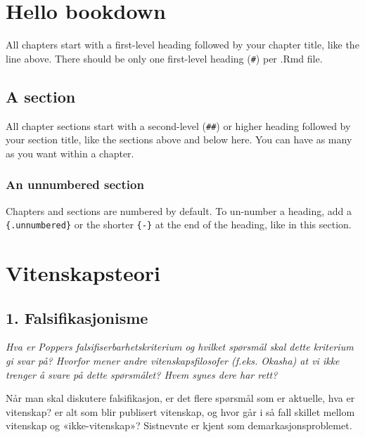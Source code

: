 \documentclass[
]{book}
\begin{document}
\hypertarget{hello-bookdown}{%
\chapter{Hello bookdown}\label{hello-bookdown}}

All chapters start with a first-level heading followed by your chapter title, like the line above. There should be only one first-level heading (\texttt{\#}) per .Rmd file.

\hypertarget{a-section}{%
\section{A section}\label{a-section}}

All chapter sections start with a second-level (\texttt{\#\#}) or higher heading followed by your section title, like the sections above and below here. You can have as many as you want within a chapter.

\hypertarget{an-unnumbered-section}{%
\subsection*{An unnumbered section}\label{an-unnumbered-section}}

Chapters and sections are numbered by default. To un-number a heading, add a \texttt{\{.unnumbered\}} or the shorter \texttt{\{-\}} at the end of the heading, like in this section.

\hypertarget{vitenskapsteori}{%
\chapter{Vitenskapsteori}\label{vitenskapsteori}}

\hypertarget{falsifikasjonisme}{%
\section{1. Falsifikasjonisme}\label{falsifikasjonisme}}

\emph{Hva er Poppers falsifiserbarhetskriterium og hvilket spørsmål skal
dette kriterium gi svar på? Hvorfor mener andre vitenskapsfilosofer
(f.eks. Okasha) at vi ikke trenger å svare på dette spørsmålet? Hvem
synes dere har rett?}

Når man skal diskutere falsifikasjon, er det flere spørsmål som er
aktuelle, hva er vitenskap? er alt som blir publisert vitenskap, og hvor
går i så fall skillet mellom vitenskap og «ikke-vitenskap»? Sistnevnte
er kjent som demarkasjonsproblemet.
\end{document}
